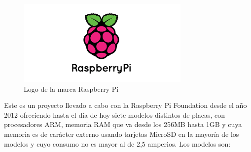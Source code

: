 \begin{figure}[htb]
\centering
\includegraphics[scale=0.65]{./Figuras/raspi_logo.png}
\caption{Logo de la marca Raspberry Pi}
\label{fig:raspi_logo}
\vspace*{-10pt}
\end{figure}

Este es un proyecto llevado a cabo con la Raspberry Pi Foundation\cite{RaspberryPi} desde el año 2012 ofreciendo hasta el día de hoy siete modelos distintos de placas, con procesadores ARM, memoria RAM que va desde los 256MB hasta 1GB y cuya memoria es de carácter externo usando tarjetas MicroSD en la mayoría de los modelos y cuyo consumo no es mayor al de 2,5 amperios. Los modelos son:
